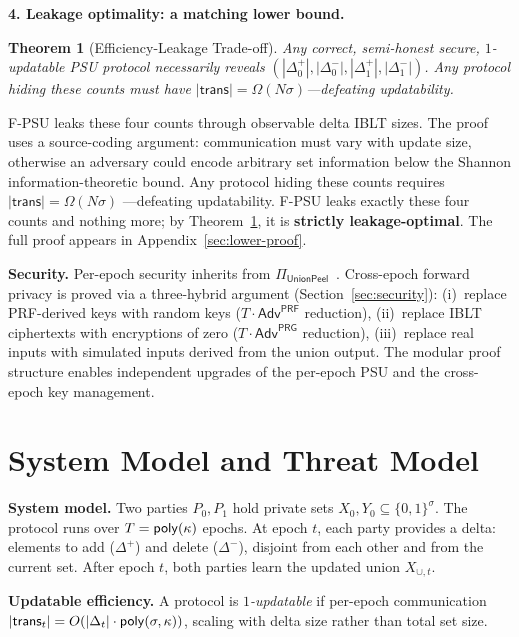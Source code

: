 \documentclass[letterpaper,twocolumn,10pt]{article}
\newtheorem{theorem}{Theorem}
\theoremstyle{definition}
\begin{document}
\smallskip\noindent\textbf{4. Leakage optimality: a matching lower bound.}\label{sec:barrier}

\begin{theorem}[Efficiency-Leakage Trade-off]\label{thm:lower}
Any correct, semi-honest secure, $1$-updatable PSU protocol necessarily reveals
$(|\Delta^+_0|, |\Delta^-_0|, |\Delta^+_1|, |\Delta^-_1|)$. Any protocol
hiding these counts must have $|\mathsf{trans}| = \Omega(N\sigma)$---defeating
updatability.
\end{theorem}

F-PSU leaks these four counts through observable delta IBLT sizes. The proof
uses a source-coding argument:
communication must vary with update size, otherwise an adversary could encode
arbitrary set information below the Shannon information-theoretic bound. Any
protocol hiding these counts requires $|\mathsf{trans}| = \Omega(N\sigma)$
---defeating updatability. F-PSU leaks exactly these four counts and
nothing more; by Theorem~\ref{thm:lower}, it is \textbf{strictly
leakage-optimal}. The full proof appears in Appendix~\ref{sec:lower-proof}.

\smallskip\noindent\textbf{Security.}
Per-epoch security inherits from $\Pi_{\mathsf{UnionPeel}}$~\cite{PT26}.
Cross-epoch forward privacy is proved via a three-hybrid argument
(Section~\ref{sec:security}): (i)~replace PRF-derived keys with random keys
($T \cdot \mathsf{Adv}^{\mathsf{PRF}}$ reduction), (ii)~replace IBLT
ciphertexts with encryptions of zero ($T \cdot \mathsf{Adv}^{\mathsf{PRG}}$
reduction), (iii)~replace real inputs with simulated inputs derived from the
union output. The modular proof structure enables independent upgrades of the
per-epoch PSU and the cross-epoch key management.

\section{System Model and Threat Model}

\textbf{System model.} Two parties $P_0, P_1$ hold private sets $X_0, Y_0
\subseteq \{0,1\}^\sigma$. The protocol runs over $T = \mathsf{poly}(\kappa)$ epochs.
At epoch $t$, each party provides a delta: elements to add ($\Delta^+$) and
delete ($\Delta^-$), disjoint from each other and from the current set. After
epoch $t$, both parties learn the updated union $X_{\cup,t}$.

\textbf{Updatable efficiency.} A protocol is \emph{$1$-updatable} if per-epoch
communication $|\mathsf{trans}_t| = O(|\Delta_t| \cdot \mathsf{poly}(\sigma, \kappa))$,
scaling with delta size rather than total set size.
\end{document}
